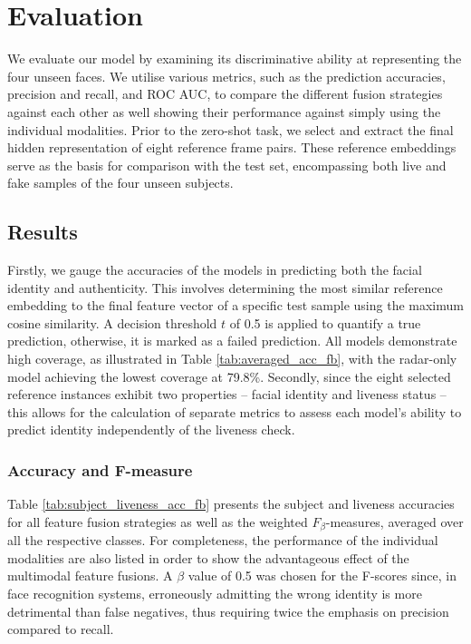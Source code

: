 \documentclass{mpaper}
\begin{document}
\section{Evaluation}
We evaluate our model by examining its discriminative ability at representing the four unseen faces. We utilise various metrics, such as the prediction accuracies, precision and recall, and ROC AUC, to compare the different fusion strategies against each other as well showing their performance against simply using the individual modalities. Prior to the zero-shot task, we select and extract the final hidden representation of eight reference frame pairs. These reference embeddings serve as the basis for comparison with the test set, encompassing both live and fake samples of the four unseen subjects.

\subsection{Results}
Firstly, we gauge the accuracies of the models in predicting both the facial identity and authenticity. This involves determining the most similar reference embedding to the final feature vector of a specific test sample using the maximum cosine similarity. A decision threshold $t$ of 0.5 is applied to quantify a true prediction, otherwise, it is marked as a failed prediction. All models demonstrate high coverage, as illustrated in Table \ref{tab:averaged_acc_fb}, with the radar-only model achieving the lowest coverage at 79.8\%. Secondly, since the eight selected reference instances exhibit two properties -- facial identity and liveness status -- this allows for the calculation of separate metrics to assess each model's ability to predict identity independently of the liveness check.

\subsubsection{Accuracy and F-measure}
Table \ref{tab:subject_liveness_acc_fb} presents the subject and liveness accuracies for all feature fusion strategies as well as the weighted $F_{\beta}$-measures, averaged over all the respective classes. For completeness, the performance of the individual modalities are also listed in order to show the advantageous effect of the multimodal feature fusions. A $\beta$ value of 0.5 was chosen for the F-scores since, in face recognition systems, erroneously admitting the wrong identity is more detrimental than false negatives, thus requiring twice the emphasis on precision compared to recall.
\end{document}
